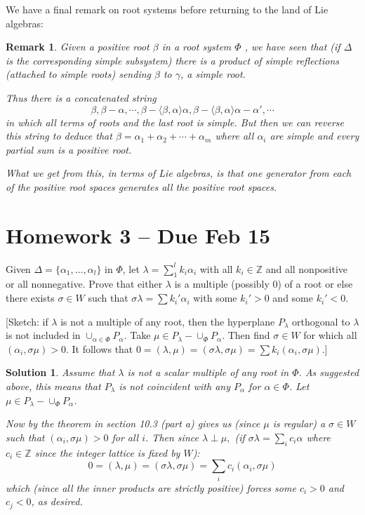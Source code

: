 \documentclass[12pt]{article}
\newenvironment{hwprob}[1]
{\renewcommand{\theprob}{#1}%
 \addtocounter{thm}{-1}%
 \begin{prob}}
{\end{prob}}
\theoremstyle{nonumberbreak}
\newtheorem{sol}{Solution}
\theoremstyle{changebreak}
\theoremstyle{nonumberbreak}
\theoremstyle{change}
\newtheorem{rmk}[thm]{Remark}
\newcommand*{\Z}{
\mathbb{Z}
}
\begin{document}
We have a final remark on root systems before returning to the land of Lie algebras:
\begin{rmk}
	Given a positive root $\beta$ in a root system $\Phi$ , we have seen that (if $\Delta$ is the corresponding simple subsystem)
	there is a product of simple reflections (attached to simple roots) sending $\beta$ to $\gamma$, a simple root.

	Thus there is a concatenated string
	\[\beta,\beta-\alpha,\cdots,\beta-\langle\beta,\alpha\rangle\alpha,\beta-\langle\beta,\alpha\rangle\alpha-\alpha',\cdots\]
	in which all terms of roots and the last root is simple. But then we can reverse this string to deduce that
	$\beta=\alpha_1+\alpha_2+\cdots+\alpha_m$ where all $\alpha_i$ are simple and every partial sum is a positive root.

	What we get from this, in terms of Lie algebras, is that one generator from each of the positive root spaces generates all the positive root spaces.
\end{rmk}

\newpage
\section*{Homework 3 -- Due Feb 15}
\begin{hwprob}{10.10}
	Given $\Delta=\{\alpha_1,\dots,\alpha_l\}$ in $\Phi$, let $\lambda=\sum_1^lk_i\alpha_i$ with all $k_i\in\Z$ and all nonpositive or all nonnegative. Prove that
	either $\lambda$ is a multiple (possibly 0) of a root or else there exists $\sigma\in W$ such that $\sigma\lambda=\sum k_i'\alpha_i$ with 
	some $k_i'>0$ and some $k_i'<0$. 
	
	[Sketch: if $\lambda$ is not a multiple of any root, then the hyperplane
	$P_\lambda$ orthogonal to $\lambda$ is not included in $\cup_{\alpha\in\Phi}P_\alpha$. Take $\mu\in P_\lambda-\cup_\Phi P_\alpha$. Then find
	$\sigma\in W$ for which all $(\alpha_i,\sigma\mu)>0$. It follows that $0=(\lambda,\mu)=(\sigma\lambda,\sigma\mu)=\sum k_i(\alpha_i,\sigma\mu).$]
\end{hwprob}
\begin{sol}
	Assume that $\lambda$ is not a scalar multiple of any root in $\Phi$. As suggested above, this means that $P_\lambda$ 
	is not coincident with any $P_\alpha$ for $\alpha\in\Phi$. Let $\mu\in P_\lambda-\cup_\Phi P_\alpha$.

	Now by the theorem in section 10.3 (part a) gives us (since $\mu$ is regular) a $\sigma\in W$ such that $(\alpha_i,\sigma\mu)>0$ for all $i$.
	Then since $\lambda\perp\mu,$ (if $\sigma\lambda=\sum_i c_i\alpha$ where $c_i\in\Z$ since the integer lattice is fixed by $W$):
	\[0=(\lambda,\mu)=(\sigma\lambda,\sigma\mu)=\sum_i c_i(\alpha_i,\sigma\mu)\]
	which (since all the inner products are strictly positive) forces some $c_i>0$ and $c_j<0$, as desired.
\end{sol}
\end{document}
